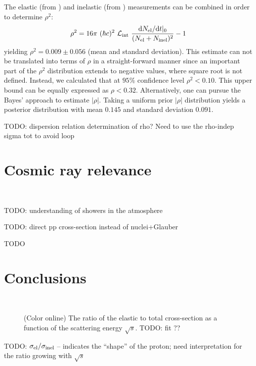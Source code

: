 \documentclass[doublecol]{epl/epl2}
\def\d{{\rm d}}
\begin{document}
The elastic (from \cite{P1}) and inelastic (from \cite{P2}) measurements can be combined in order to determine $\rho^2$:
\begin{equation}
\label{eq:rho}
\rho^2 = 16\pi\ (\hbar c)^2\ {\cal L_{\rm int}}\ {\d N_{\rm el}/\d t|_0\over (N_{\rm el} + N_{\rm inel})^2} - 1
\end{equation}
yielding $\rho^2 = 0.009 \pm 0.056$ (mean and standard deviation). This estimate can not be translated into terms of $\rho$ in a straight-forward manner since an important part of the $\rho^2$ distribution extends to negative values, where square root is not defined. Instead, we calculated that at $95\%$ confidence level $\rho^2 < 0.10$. This upper bound can be equally expressed as $\rho < 0.32$. Alternatively, one can pursue the Bayes' approach to estimate $|\rho|$. Taking a uniform prior $|\rho|$ distribution yields a posterior distribution with mean $0.145$ and standard deviation $0.091$.

TODO: dispersion relation determination of rho? Need to use the rho-indep sigma tot to avoid loop



\section{Cosmic ray relevance}

~

TODO: understanding of showers in the atmosphere

TODO: direct pp cross-section instead of nuclei+Glauber

TODO
	


\section{Conclusions}

~

\begin{figure}
\vskip-5mm
\caption{(Color online) The ratio of the elastic to total cross-section as a function of the scattering energy $\sqrt s$. TODO: fit ??}
\label{fig:sigma rat}
\end{figure}

TODO: $\sigma_{\rm el} / \sigma_{\rm inel}$ -- indicates the ``shape'' of the proton; need interpretation for the ratio growing with $\sqrt s$
\end{document}

